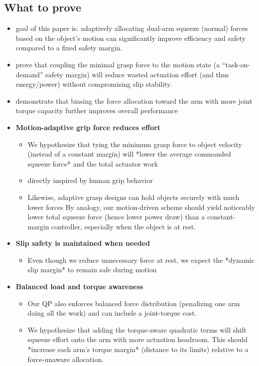 \documentclass[conference]{IEEEtran}
\begin{document}
\subsection*{What to prove}
\begin{itemize}
    \item goal of this paper is: adaptively allocating dual-arm squeeze (normal) forces based on the object’s motion can significantly improve efficiency and safety compared to a fixed safety margin.
    \item prove that coupling the minimal grasp force to the motion state (a “task-on-demand” safety margin) will reduce wasted actuation effort (and thus energy/power) without compromising slip stability.
    \item demonstrate that biasing the force allocation toward the arm with more joint torque capacity further improves overall performance
    \item \textbf{Motion-adaptive grip force reduces effort}
    \begin{itemize}
        \item  We hypothesize that tying the minimum grasp force to object velocity (instead of a constant margin) will *lower the average commanded squeeze force* and the total actuator work
        \item directly inspired by human grip behavior
        \item Likewise, adaptive grasp designs can hold objects securely with much lower forces By analogy, our motion-driven scheme should yield noticeably lower total squeeze force (hence lower power draw) than a constant-margin controller, especially when the object is at rest. 
    \end{itemize}
    \item \textbf{Slip safety is maintained when needed}
        \begin{itemize}
            \item Even though we reduce unnecessary force at rest, we expect the *dynamic slip margin* to remain safe during motion
        \end{itemize}

    \item \textbf{Balanced load and torque awareness}
        \begin{itemize}
            \item Our QP also enforces balanced force distribution (penalizing one arm doing all the work) and can include a joint-torque cost.
            \item We hypothesize that adding the torque-aware quadratic terms will shift squeeze effort onto the arm with more actuation headroom.
            This should *increase each arm’s torque margin* (distance to its limits) relative to a force-unaware allocation.
        \end{itemize}
\end{itemize}
\end{document}
